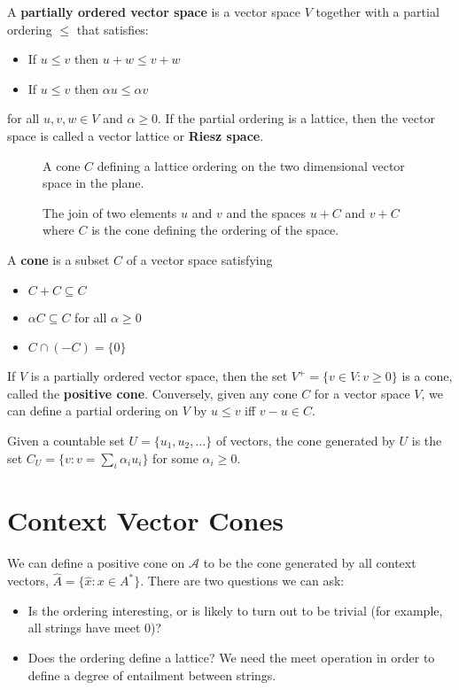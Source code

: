 \documentclass{article}
\begin{document}
A \textbf{partially ordered vector space} is a vector space $V$
together with a partial ordering $\le$ that satisfies:
\begin{itemize}
\item If $u \le v$ then $u + w \le v + w$
\item If $u \le v$ then $\alpha u \le \alpha v$
\end{itemize}
for all $u,v,w \in V$ and $\alpha \ge 0$. If the partial ordering is a
lattice, then the vector space is called a vector lattice or
\textbf{Riesz space}.

\begin{figure}
\begin{center}

\end{center}
\caption{A cone $C$ defining a lattice ordering on the two dimensional
  vector space in the plane.}
\end{figure}

\begin{figure}
\begin{center}

\end{center}
\caption{The join of two elements $u$ and $v$ and the spaces $u + C$
  and $v + C$ where $C$ is the cone defining the ordering of the
  space.}
\end{figure}

A \textbf{cone} is a subset $C$ of a vector space satisfying
\begin{itemize}
\item $C + C \subseteq C$
\item $\alpha C \subseteq C$ for all $\alpha \ge 0$
\item $C \cap (-C) = \{0\}$
\end{itemize}
If $V$ is a partially ordered vector space, then the set $V^+ = \{v
\in V : v \ge 0\}$ is a cone, called the \textbf{positive
  cone}. Conversely, given any cone $C$ for a vector space $V$, we can
define a partial ordering on $V$ by $u \le v$ iff $v - u \in C$.

Given a countable set $U = \{u_1, u_2, \ldots\}$ of vectors, the cone
generated by $U$ is the set $C_U = \{v : v = \sum_i \alpha_i u_i\}$ for
some $\alpha_i \ge 0$.

\section{Context Vector Cones}

We can define a positive cone on $\mathcal{A}$ to be the cone
generated by all context vectors, $\hat{A} = \{\hat{x} : x \in A^*\}$. There are
two questions we can ask:
\begin{itemize}
\item Is the ordering interesting, or is likely to turn out to be
  trivial (for example, all strings have meet $0$)?
\item Does the ordering define a lattice? We need the meet operation
in order to define a degree of entailment between strings.
\end{itemize}
\end{document}
